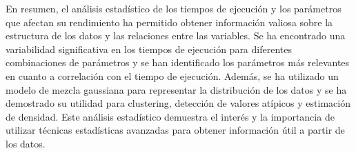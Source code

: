 En resumen, el análisis estadístico de los tiempos de ejecución y los parámetros que afectan su rendimiento ha permitido obtener información valiosa sobre la estructura de los datos y las relaciones entre las variables. Se ha encontrado una variabilidad significativa en los tiempos de ejecución para diferentes combinaciones de parámetros y se han identificado los parámetros más relevantes en cuanto a correlación con el tiempo de ejecución. Además, se ha utilizado un modelo de mezcla gaussiana para representar la distribución de los datos y se ha demostrado su utilidad para clustering, detección de valores atípicos y estimación de densidad. Este análisis estadístico demuestra el interés y la importancia de utilizar técnicas estadísticas avanzadas para obtener información útil a partir de los datos.